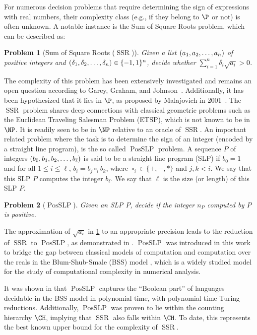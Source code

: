 \documentclass[a4paper, 11pt,dvipsnames]{article}
\newtheorem{problem}{Problem}
\newcommand{\posslp}{\operatorname{PosSLP}}
\newcommand{\SSR}{\operatorname{SSR}}
\begin{document}
For numerous decision problems that require determining the sign of expressions with real numbers, their complexity class (e.g., if they belong to $\P$ or not) is often unknown. A notable instance is the Sum of Square Roots problem, which can be described as:	

\begin{problem} [Sum of Square Roots ($\SSR$)] Given a list $(a_{1},a_{2},\dots,a_{n})$ of positive integers  and $(\delta_{1},\delta_{2},\dots,\delta_{n}) \in \{-1,1\}^n$, decide whether
$\sum_{i=1}^n \delta_i \sqrt{a_i} > 0$.  \label{pb:SSR} \end{problem}

The complexity of this problem has been extensively investigated and remains an open question according to Garey, Graham, and Johnson~\cite{garey1976some}. Additionally, it has been hypothesized that it lies in $\P$, as proposed by Malajovich in 2001~\cite{Malajovich2001AnEV}. The $\SSR$ problem shares deep connections with classical geometric problems such as the Euclidean Traveling Salesman Problem (ETSP),  which is not known to be in $\NP$. It is readily seen to be in $\NP$ relative to an oracle of $\SSR$. An important related problem where the task is to determine the sign of an integer (encoded by a straight line program), is the so called $\posslp$ problem. A sequence $P$ of integers $(b_0, b_{1},b_{2},\dots,b_{\ell})$ is said
to be a straight line program (SLP) if $b_{0}=1$ and for all $1\leq i\leq\ell$, $b_{i}=b_{j}\circ_i b_{k}$, where $\circ_i\in\{+,-,*\}$ and $j,k<i$. We say that this SLP $P$ computes the integer  $b_{\ell}$. We say that $\ell$ is the size (or length) of this SLP $P$.
\begin{problem} [$\posslp$] Given an SLP $P$, decide if the integer $n_P$ computed by $P$ is positive. \label{pb:posslp}
\end{problem}
The approximation of $\sqrt{a_i}$ in \cref{pb:SSR} to an appropriate precision leads to the reduction of $\SSR$ to $\posslp$, as demonstrated in \cite{comp_num_analysis}. $\posslp$ was introduced in this work to bridge the gap between classical models of computation and computation over the reals in the Blum-Shub-Smale (BSS) model \cite{SmaleRealCompu1997}, which is a widely studied model for the study of computational complexity in numerical analysis.

It was shown in \cite{comp_num_analysis} that $\posslp$ captures the ``Boolean part'' of languages decidable in the BSS model in polynomial time, with polynomial time Turing reductions. Additionally, $\posslp$ was proven to lie within the counting hierarchy $\CH$, implying that $\SSR$ also falls within $\CH$. To date, this represents the best known upper bound for the complexity of $\SSR$.
\end{document}
